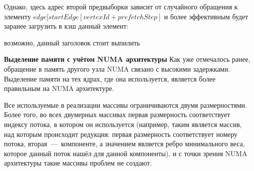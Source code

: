 \documentclass[a4paper,10pt]{extarticle}
\begin{document}
Однако, здесь адрес второй предвыборки зависит от случайного обращения к элементу $edge[startEdge[vertexId + prefetchStep]$ и более эффективным будет заранее загрузить в кэш данный элемент:
\begin{algorithm}
    \SetAlgoLined
    \caption{возможно, данный заголовок стоит выпилить}
\end{algorithm}



\textbf{Выделение памяти с учётом NUMA архитектуры}
Как уже отмечалось ранее, обращение в память другого узла NUMA связано с высокими задержками. Выделение памяти на тех ядрах, где она используется, является более правильным на NUMA архитектуре.


Все используемые в реализации массивы ограничиваются двумя размерностями. Более того, во всех двумерных массивах первая размерность соответствует индексу потока, в котором он используется (например, таким является массив, над которым происходит редукция: первая размерность соответствует номеру потока, вторая~---~компоненте, а значением является ребро минимального веса, которое данный поток нашёл для данной компоненты), и с точки зрения NUMA архитектуры такие массивы проблем не создают.

\end{document}
